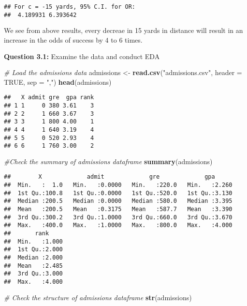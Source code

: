 \documentclass[]{article}
\newenvironment{Shaded}{\begin{snugshade}}{\end{snugshade}}
\newcommand{\CommentTok}[1]{\textcolor[rgb]{0.56,0.35,0.01}{\textit{#1}}}
\newcommand{\DataTypeTok}[1]{\textcolor[rgb]{0.13,0.29,0.53}{#1}}
\newcommand{\KeywordTok}[1]{\textcolor[rgb]{0.13,0.29,0.53}{\textbf{#1}}}
\newcommand{\NormalTok}[1]{#1}
\newcommand{\OtherTok}[1]{\textcolor[rgb]{0.56,0.35,0.01}{#1}}
\newcommand{\StringTok}[1]{\textcolor[rgb]{0.31,0.60,0.02}{#1}}
\begin{document}
\begin{verbatim}
## For c = -15 yards, 95% C.I. for OR:
##  4.189931 6.393642
\end{verbatim}

We see from above results, every decreae in 15 yards in distance will
result in an increase in the odds of success by 4 to 6 times.

\newpage

\textbf{Question 3.1:} Examine the data and conduct EDA

\begin{Shaded}
\begin{Highlighting}[]
\CommentTok{# Load the admissions data}
\NormalTok{admissions <-}\StringTok{ }\KeywordTok{read.csv}\NormalTok{(}\StringTok{"admissions.csv"}\NormalTok{, }\DataTypeTok{header =} \OtherTok{TRUE}\NormalTok{, }\DataTypeTok{sep =} \StringTok{","}\NormalTok{)}
\KeywordTok{head}\NormalTok{(admissions)}
\end{Highlighting}
\end{Shaded}

\begin{verbatim}
##   X admit gre  gpa rank
## 1 1     0 380 3.61    3
## 2 2     1 660 3.67    3
## 3 3     1 800 4.00    1
## 4 4     1 640 3.19    4
## 5 5     0 520 2.93    4
## 6 6     1 760 3.00    2
\end{verbatim}

\begin{Shaded}
\begin{Highlighting}[]
\CommentTok{#Check the summary of admissions dataframe}
\KeywordTok{summary}\NormalTok{(admissions)}
\end{Highlighting}
\end{Shaded}

\begin{verbatim}
##        X             admit             gre             gpa       
##  Min.   :  1.0   Min.   :0.0000   Min.   :220.0   Min.   :2.260  
##  1st Qu.:100.8   1st Qu.:0.0000   1st Qu.:520.0   1st Qu.:3.130  
##  Median :200.5   Median :0.0000   Median :580.0   Median :3.395  
##  Mean   :200.5   Mean   :0.3175   Mean   :587.7   Mean   :3.390  
##  3rd Qu.:300.2   3rd Qu.:1.0000   3rd Qu.:660.0   3rd Qu.:3.670  
##  Max.   :400.0   Max.   :1.0000   Max.   :800.0   Max.   :4.000  
##       rank      
##  Min.   :1.000  
##  1st Qu.:2.000  
##  Median :2.000  
##  Mean   :2.485  
##  3rd Qu.:3.000  
##  Max.   :4.000
\end{verbatim}

\begin{Shaded}
\begin{Highlighting}[]
\CommentTok{# Check the structure of admissions dataframe}
\KeywordTok{str}\NormalTok{(admissions)}
\end{Highlighting}
\end{Shaded}
\end{document}
